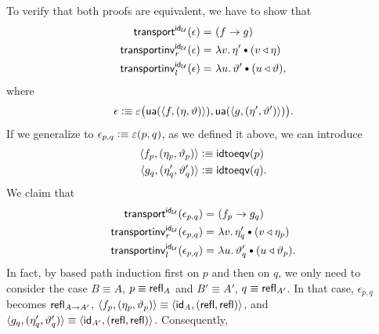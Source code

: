 \begin{solution}
\begin{enumerate}[a),font=\upshape]
\begin{enumerate}
            To verify that both proofs are equivalent, we have to show that
            \begin{align*}
                \fun{transport}^{\id_\univ}(\epsilon)
                    &\eq{}(f\to g)\\
                \fun{transportinv}_r^{\id_\univ}(\epsilon)
                    &\eq{}\lambda v.\,\eta'\hct(v\lwct\eta)\\
                \fun{transportinv}_l^{\id_\univ}(\epsilon)
                    &\eq{}\lambda u.\,\vartheta'\hct(u\lwct\vartheta),
            \end{align*}
            where
            \[
                \epsilon\mathrel{\vcentcolon}\equiv
                    \varepsilon
                        \bigl(
                            \mathsf{ua}(\langle
                                f,(\eta,\vartheta)
                            \rangle),
                            \mathsf{ua}(\langle
                                g,(\eta',\vartheta')
                            \rangle)
                        \bigr).
            \]
            If we generalize to $\epsilon_{p,q}\mathrel{\vcentcolon}\equiv\varepsilon(p,q)$, as we defined it above, we can introduce
            \begin{align*}
                \langle f_p,(\eta_p,\vartheta_p)\rangle
                    &\mathrel{\vcentcolon}\equiv\mathsf{idtoeqv}(p)\\
                \langle g_q,(\eta'_q,\vartheta'_q)\rangle
                    &\mathrel{\vcentcolon}\equiv\mathsf{idtoeqv}(q).
            \end{align*}
            We claim that
            \begin{equation}\label{eq:p-q-claim}
                \begin{aligned}
                    \fun{transport}^{\id_\univ}(\epsilon_{p,q})
                        &\eq{}(f_p\to g_q)\\
                    \fun{transportinv}_r^{\id_\univ}(\epsilon_{p,q})
                        &\eq{}\lambda v.\,\eta'_q\hct(v\lwct\eta_p)\\
                    \fun{transportinv}_l^{\id_\univ}(\epsilon_{p,q})
                        &\eq{}\lambda u.\,
                            \vartheta'_q\hct(u\lwct\vartheta_p).
                \end{aligned}
            \end{equation}
            In fact, by based path induction first on $p$ and then on $q$, we only need to consider the case $B\equiv A$, $p\equiv\mathsf{refl}_A$ and $B'\equiv A'$, $q\equiv\mathsf{refl}_{A'}$. In that case, $\epsilon_{p,q}$ becomes $\mathsf{refl}_{A\to A'}$, $\langle f_p,(\eta_p,\vartheta_p)\rangle\equiv\langle\mathsf{id}_A,(\mathsf{refl},\mathsf{refl})\rangle$, and $\langle g_q,(\eta'_q,\vartheta'_q)\rangle\equiv\langle\mathsf{id}_{A'},(\mathsf{refl},\mathsf{refl})\rangle$. Consequently,

\end{enumerate}
\end{enumerate}
\end{solution}
